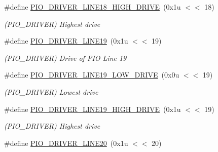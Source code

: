 \begin{DoxyCompactItemize}
\mbox{\label{group__SAME70__PIO_ga2304d44f8d5343097394ee85aa38f62e}} 
\#define \mbox{\hyperlink{group__SAME70__PIO_ga2304d44f8d5343097394ee85aa38f62e}{P\+I\+O\+\_\+\+D\+R\+I\+V\+E\+R\+\_\+\+L\+I\+N\+E18\+\_\+\+H\+I\+G\+H\+\_\+\+D\+R\+I\+VE}}~(0x1u $<$$<$ 18)
\begin{DoxyCompactList}\small\item\em (P\+I\+O\+\_\+\+D\+R\+I\+V\+ER) Highest drive \end{DoxyCompactList}\item 
\mbox{\label{group__SAME70__PIO_ga8ea454bc8ccef506848f248863b2043f}} 
\#define \mbox{\hyperlink{group__SAME70__PIO_ga8ea454bc8ccef506848f248863b2043f}{P\+I\+O\+\_\+\+D\+R\+I\+V\+E\+R\+\_\+\+L\+I\+N\+E19}}~(0x1u $<$$<$ 19)
\begin{DoxyCompactList}\small\item\em (P\+I\+O\+\_\+\+D\+R\+I\+V\+ER) Drive of P\+IO Line 19 \end{DoxyCompactList}\item 
\mbox{\label{group__SAME70__PIO_ga9ccf13eb1f24774ba50fe95f8957378b}} 
\#define \mbox{\hyperlink{group__SAME70__PIO_ga9ccf13eb1f24774ba50fe95f8957378b}{P\+I\+O\+\_\+\+D\+R\+I\+V\+E\+R\+\_\+\+L\+I\+N\+E19\+\_\+\+L\+O\+W\+\_\+\+D\+R\+I\+VE}}~(0x0u $<$$<$ 19)
\begin{DoxyCompactList}\small\item\em (P\+I\+O\+\_\+\+D\+R\+I\+V\+ER) Lowest drive \end{DoxyCompactList}\item 
\mbox{\label{group__SAME70__PIO_gaf8a905aa93d4aac65d77c28dc690f58b}} 
\#define \mbox{\hyperlink{group__SAME70__PIO_gaf8a905aa93d4aac65d77c28dc690f58b}{P\+I\+O\+\_\+\+D\+R\+I\+V\+E\+R\+\_\+\+L\+I\+N\+E19\+\_\+\+H\+I\+G\+H\+\_\+\+D\+R\+I\+VE}}~(0x1u $<$$<$ 19)
\begin{DoxyCompactList}\small\item\em (P\+I\+O\+\_\+\+D\+R\+I\+V\+ER) Highest drive \end{DoxyCompactList}\item 
\mbox{\label{group__SAME70__PIO_ga9508975d98d9cbcc937f20b69c6789ee}} 
\#define \mbox{\hyperlink{group__SAME70__PIO_ga9508975d98d9cbcc937f20b69c6789ee}{P\+I\+O\+\_\+\+D\+R\+I\+V\+E\+R\+\_\+\+L\+I\+N\+E20}}~(0x1u $<$$<$ 20)
$$
\end{DoxyCompactItemize}
